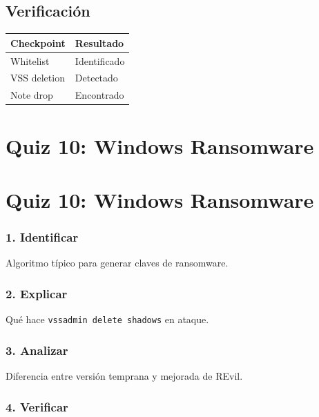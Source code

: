 \documentclass[
  letterpaper,
]{report}
\newcounter{none} %
\begin{document}
\section{Verificación}\label{verificaciuxf3n-8}

{\def\LTcaptype{none} %
\begin{longtable}[]{@{}ll@{}}
\toprule\noalign{}
Checkpoint & Resultado \\
\midrule\noalign{}
\endhead
\bottomrule\noalign{}
\endlastfoot
Whitelist & Identificado \\
VSS deletion & Detectado \\
Note drop & Encontrado \\
\end{longtable}
}

\chapter{Quiz 10: Windows Ransomware}\label{quiz-10-windows-ransomware}

\chapter{Quiz 10: Windows
Ransomware}\label{quiz-10-windows-ransomware-1}

\subsection{1. Identificar}\label{identificar-5}

Algoritmo típico para generar claves de ransomware.

\subsection{2. Explicar}\label{explicar-5}

Qué hace \texttt{vssadmin\ delete\ shadows} en ataque.

\subsection{3. Analizar}\label{analizar-2}

Diferencia entre versión temprana y mejorada de REvil.

\subsection{4. Verificar}\label{verificar-3}
\end{document}

